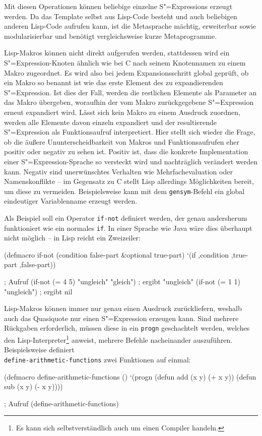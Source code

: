 \documentclass[12pt, a4paper, bibgerm]{scrbook}
\newenvironment{DIFnomarkup}{}{}
\newcommand\icode[1]{\lstinline?#1?}
\newcommand{\sexp}{S"=Expression}
\newcommand{\sexps}{S"=Expressions}
\begin{document}
Mit diesen Operationen können beliebige einzelne \sexps{} erzeugt
werden. Da das Template selbst aus Lisp-Code besteht und auch beliebigen
anderen Lisp-Code aufrufen kann, ist die Metasprache mächtig,
erweiterbar sowie modularisierbar und benötigt vergleichsweise kurze
Metaprogramme.

Lisp-Makros können nicht direkt aufgerufen werden, stattdessen wird ein
\sexp{}-Knoten ähnlich wie bei C nach seinem Knotennamen zu einem Makro
zugeordnet. Es wird also bei jedem Expansionsschritt global geprüft, ob
ein Makro so benannt ist wie das erste Element des zu expandierenden
\sexp{}. Ist dies der Fall, werden die restlichen Elemente als Parameter
an das Makro übergeben, woraufhin der vom Makro zurückgegebene \sexp{}
erneut expandiert wird. Lässt sich kein Makro zu einem Ausdruck
zuordnen, werden alle Elemente davon einzeln expandiert und der
resultierende \sexp{} als Funktionsaufruf interpretiert. Hier stellt
sich wieder die Frage, ob die äußere Ununterscheidbarkeit von Makros und
Funktionsaufrufen eher positiv oder negativ zu sehen ist. Positiv ist,
dass die konkrete Implementation einer \sexp{}-Sprache so versteckt wird
und nachträglich verändert werden kann. Negativ sind unerwünschtes
Verhalten wie Mehrfachevaluation oder Namenskonflikte -- im Gegensatz zu
C stellt Lisp allerdings Möglichkeiten bereit, um diese zu
vermeiden. Beispielsweise kann mit dem \icode{gensym}-Befehl ein global
eindeutiger Variablenname erzeugt werden.

Als Beispiel soll ein Operator \icode{if-not} definiert werden, der
genau andersherum funktioniert wie ein normales \icode{if}. In einer
Sprache wie Java wäre dies überhaupt nicht möglich -- in Lisp reicht ein
Zweizeiler:

\begin{code}
(defmacro if-not (condition false-part &optional true-part)
  `(if ,condition ,true-part ,false-part))

; Aufruf
(if-not (= 4 5) "ungleich" "gleich")  ; ergibt "ungleich"  
(if-not (= 1 1) "ungleich")           ; ergibt nil
\end{code}

Lisp-Makros können immer nur genau einen Ausdruck zurückliefern, weshalb
auch das Quasiquote nur einen \sexp{} erzeugen kann. Sind mehrere
Rückgaben erforderlich, müssen diese in ein \icode{progn} geschachtelt
werden, welches den Lisp-Interpreter\footnote{Es kann sich
  selbstverständlich auch um einen Compiler handeln.} anweist, mehrere
Befehle nacheinander auszuführen. Beispielsweise definiert \\
\icode{define-arithmetic-functions} zwei Funktionen auf einmal:
\begin{DIFnomarkup}\begin{code}
(defmacro define-arithmetic-functions ()
  `(progn (defun add (x y) (+ x y))
          (defun sub (x y) (- x y))))


; Aufruf
(define-arithmetic-functions)
\end{code}\end{DIFnomarkup}
\end{document}
